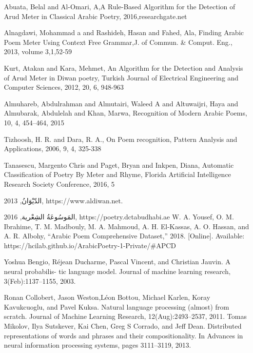 \begin{thebibliography}{999}
Abuata, Belal and Al-Omari‏, A,A Rule-Based Algorithm for the Detection of Arud Meter in Classical Arabic Poetry, 2016‏,researchgate.net‏

 Alnagdawi, Mohammad a and Rashideh, Hasan and Fahed, Ala, Finding Arabic Poem Meter Using Context Free Grammar,J. of Commun. {\&} Comput. Eng., 2013, volume  3,1,52-59

 Kurt, Atakan and Kara, Mehmet, An Algorithm for the Detection and Analysis of Arud Meter in Diwan poetry, Turkish Journal of Electrical Engineering and Computer Sciences, 2012, 20, 6, 948-963

 Almuhareb, Abdulrahman and Almutairi, Waleed A and Altuwaijri, Haya and Almubarak, Abdulelah and Khan, Marwa, Recognition of Modern Arabic Poems, 10, 4, 454--464, 2015

 Tizhoosh, H. R. and Dara, R. A., On Poem recognition, Pattern Analysis and Applications, 2006, 9, 4, 325-338

   Tanasescu, Margento Chris and Paget, Bryan and Inkpen, Diana, Automatic Classification of Poetry By Meter and Rhyme, Florida Artificial Intelligence Research Society Conference, 2016, 5

   \textarabic{الدّيْوَانُ}, 2013, https://www.aldiwan.net.

 \textarabic{المَوسُوعَةُ الشِعْرية}, 2016, https://poetry.dctabudhabi.ae
  W. A. Yousef, O. M. Ibrahime, T. M. Madbouly, M. A. Mahmoud, A. H. El-Kassas, A. O. Hassan, and A. R. Albohy, “Arabic Poem Comprehensive Dataset,” 2018. [Online]. Available: https://hcilab.github.io/ArabicPoetry-1-Private/\#APCD

    Yoshua Bengio, Réjean Ducharme,
Pascal Vincent, and Christian Jauvin. A neural probabilis-
tic language model. Journal of machine learning research,
3(Feb):1137–1155, 2003.

 Ronan Collobert, Jason Weston,Léon Bottou, Michael Karlen, Koray Kavukcuoglu, and Pavel Kuksa. Natural language processing (almost) from scratch. Journal of Machine Learning Research, 12(Aug):2493–2537, 2011.
 Tomas Mikolov, Ilya Sutskever, Kai Chen, Greg S Corrado, and Jeff Dean. Distributed representations of words and phrases and their compositionality. In Advances in neural information processing systems, pages 3111–3119, 2013.


\end{thebibliography}

